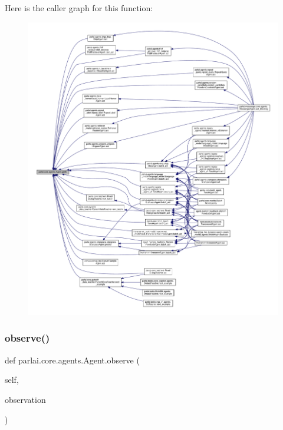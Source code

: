 Here is the caller graph for this function\+:
\nopagebreak
\begin{figure}[H]
\begin{center}
\leavevmode
\includegraphics[width=350pt]{classparlai_1_1core_1_1agents_1_1Agent_a29e1cdd729ac4236f8bae90b2e66fa04_icgraph}
\end{center}
\end{figure}
\mbox{\label{classparlai_1_1core_1_1agents_1_1Agent_a98041e2d186aa81bd5e1649a91f623bc}} 
\subsubsection{\texorpdfstring{observe()}{observe()}}
{\footnotesize\ttfamily def parlai.\+core.\+agents.\+Agent.\+observe (\begin{DoxyParamCaption}\item[{}]{self,  }\item[{}]{observation }\end{DoxyParamCaption})}

